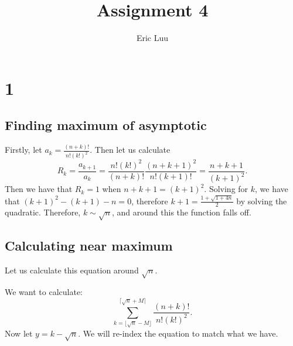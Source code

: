 \documentclass[]{article}
\title{Assignment 4}
\author{Eric Luu}
\begin{document}
\maketitle
\section{1}
\subsection{Finding maximum of asymptotic}
Firstly, let $a_k = \frac{(n + k)!}{n!(k!)^2}$. Then let us calculate 
\begin{equation}
	R_k = \frac{a_{k + 1}}{a_k} = \frac{n!(k!)^2}{(n + k)!}\frac{(n + k + 1)^2}{n! (k + 1)!} = \frac{n + k + 1}{(k + 1)^2}. 
\end{equation}
Then we have that $R_k = 1$ when $n + k + 1 = (k + 1)^2$. Solving for $k$, we have that $(k + 1)^2 - (k + 1) - n = 0$, therefore $k + 1 = \frac{1 + \sqrt{1 + 4n}}{2}$ by solving the quadratic. Therefore, $k \sim \sqrt{n}$, and around this the function falls off. 
\subsection{Calculating near maximum}
Let us calculate this equation around $\sqrt{n}$. 

We want to calculate:
\begin{equation}
	\sum_{k = \lfloor \sqrt{n} - M \rfloor }^{ \lceil \sqrt{n} + M \rceil}  \frac{(n + k)!}{n!(k!)^2}.
\end{equation}
Now let $y = k - \sqrt{n}$. We will re-index the equation to match what we have.
\end{document}

